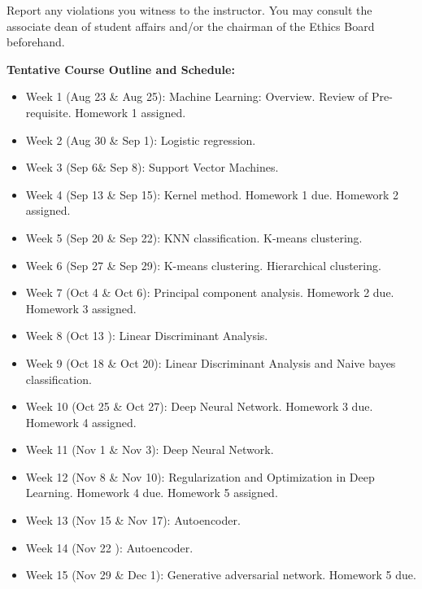 \documentclass[a4paper,10pt]{article}
\begin{document}
Report any violations you witness to the instructor. You may consult the associate dean of student affairs 
and/or the chairman of the Ethics Board beforehand. 

\textbf{Tentative Course Outline and Schedule:}

\begin{itemize}

\item Week 1 (Aug 23 \& Aug 25): Machine Learning: Overview.  Review of Pre-requisite. Homework 1 assigned. 

\item Week 2 (Aug 30 \& Sep 1): Logistic regression. 

\item Week 3 (Sep 6\& Sep 8):  Support Vector Machines. 

\item Week 4 (Sep 13 \& Sep 15): Kernel method. Homework 1 due. Homework 2 assigned.

\item Week 5 (Sep 20 \& Sep 22): KNN classification. K-means clustering. 

\item Week 6 (Sep 27 \& Sep 29): K-means clustering. Hierarchical clustering. 

\item Week 7 (Oct 4 \& Oct 6): Principal component analysis. Homework 2 due. Homework 3 assigned.

\item Week 8 (Oct 13 ):  Linear Discriminant Analysis. 

\item Week 9 (Oct 18 \& Oct 20):  Linear Discriminant Analysis and Naive bayes classification. 

\item Week 10 (Oct 25 \& Oct 27):  Deep Neural Network.  Homework 3 due. Homework 4 assigned.

\item Week 11 (Nov 1 \& Nov 3):   Deep Neural Network. 

\item Week 12 (Nov 8 \& Nov 10): Regularization and Optimization in Deep Learning.  Homework 4 due. Homework 5 assigned. 

\item Week 13 (Nov 15 \& Nov 17):  Autoencoder.

\item Week 14 (Nov 22 ): Autoencoder.

\item Week 15 (Nov 29 \& Dec 1): Generative adversarial network. Homework 5 due. 
 
\end{itemize}
\end{document}
